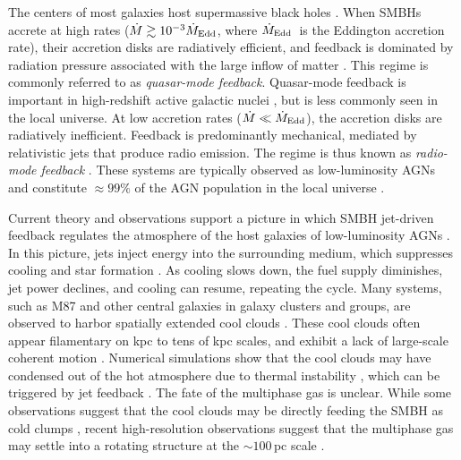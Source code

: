 The centers of most galaxies host supermassive black holes \citep[SMBHs,][]{magorrian_demography_1998,kormendy_coevolution_2013}.
When SMBHs accrete at high rates ($\dot{M} \gtrsim 10^{-3} \dot{M}_{\rm Edd}$, where $\dot{M}_{\rm Edd}$\ is the Eddington accretion rate), their accretion disks are radiatively efficient, and feedback is dominated by radiation pressure associated with the large inflow of matter \citep[e.g.,][]{cielo_agn_2018}. This regime is commonly referred to as \textit{quasar-mode feedback}.
Quasar-mode feedback is important in high-redshift active galactic nuclei \citep[AGNs, e.g.,][]{di_matteo_energy_2005}, but is less commonly seen in the local universe.
At low accretion rates ($\dot{M} \ll \dot{M}_{\rm Edd}$), the accretion disks are radiatively inefficient. Feedback is predominantly mechanical, mediated by relativistic jets that produce radio emission. The regime is thus known as \textit{radio-mode feedback} \citep[][]{mcnamara_heating_2005}.
These systems are typically observed as low-luminosity AGNs and constitute $\approx 99\%$ of the AGN population in the local universe \citep[][]{birchall_incidence_2022}.


Current theory and observations support a picture in which SMBH jet-driven feedback regulates the atmosphere of the host galaxies of low-luminosity AGNs \citep[][]{mcnamara_mechanical_2012}.
In this picture, jets inject energy into the surrounding medium, which suppresses cooling and star formation \citep[][]{combes_agn_2017}.
As cooling slows down, the fuel supply diminishes, jet power declines, and cooling can resume, repeating the cycle.
Many systems, such as M87 and other central galaxies in galaxy clusters and groups, are observed to harbor spatially extended cool clouds \citep[e.g.,][]{edge_detection_2001,salome_cold_2003,simionescu_alma_2018,boselli_virgo_2019}. These cool clouds often appear filamentary on kpc to tens of kpc scales, and exhibit a lack of large-scale coherent motion \citep[e.g.,][]{olivares_ubiquitous_2019}. Numerical simulations show that the cool clouds may have condensed out of the hot atmosphere due to thermal instability \citep{mccourt_thermal_2012,sharma_thermal_2012}, which can be triggered by jet feedback \citep{li_2014a}. The fate of the multiphase gas is unclear. While some observations suggest that the cool clouds may be directly feeding the SMBH as cold clumps \citep[e.g.,][]{tremblay_cold_2016}, recent high-resolution observations suggest that the multiphase gas may settle into a rotating structure at the $\sim100$\,pc scale \citep{osorno_revisiting_2023,oosterloo_closing_2023,tamhane_hst_2026}.


